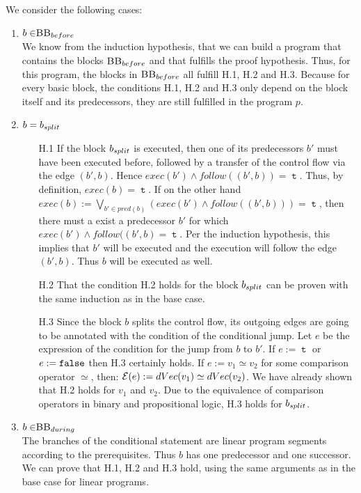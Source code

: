 We consider the following cases:
\begin{enumerate}
    \item $b \in \mbb_{before}$\\
    We know from the induction hypothesis, that we can build a program that contains the blocks $\mbb_{before}$ and that fulfills the proof hypothesis. Thus, for this program, the blocks in $\mbb_{before}$ all fulfill H.1, H.2 and H.3.
    Because for every basic block, the conditions H.1, H.2 and H.3 only depend on the block itself and its predecessors, they are still fulfilled in the program $p$.
    \item $b = b_{split}$
    \begin{itemize}
        \item[H.1] If the block $b_{split}$ is executed, then one of its predecessors $b'$ must have been executed before, followed by a transfer of the control flow via the edge $(b', b)$. Hence $exec(b') \land follow((b', b)) = \mttt$. Thus, by definition, $exec(b) = \mttt$. If on the other hand $exec(b):= \bigvee\limits_{b' \in pred(b)} (exec(b') \land follow((b', b))) = \mttt$, then there must a exist a predecessor $b'$ for which \\$exec(b') \land follow((b', b) = \mttt$. Per the induction hypothesis, this implies that $b'$ will be executed and the execution will follow the edge $(b', b)$. Thus $b$ will be executed as well.
        \item[H.2] That the condition H.2 holds for the block $b_{split}$ can be proven with the same induction as in the base case.
        \item [H.3] Since the block $b$ splits the control flow, its outgoing edges are going to be annotated with the condition of the conditional jump. Let $e$ be the expression of the condition for the jump from $b$ to $b'$. If $e := \mttt$ or $e := \mathtt{false}$ then H.3 certainly holds. If $e := v_1 \simeq v_2$ for some comparison operator $\simeq$, then:
        $\mathcal{E}(e) := dVec(v_1) \simeq dVec(v_2)$. We have already shown that H.2 holds for $v_1$ and $v_2$. Due to the equivalence of comparison operators in binary and propositional logic, H.3 holds for $b_{split}$.
    \end{itemize}
    
    \item $b \in \mbb_{during}$\\
    The branches of the conditional statement are linear program segments according to the prerequisites. Thus $b$ has one predecessor and one successor. We can prove that H.1, H.2 and H.3 hold, using the same arguments as in the base case for linear programs.
    

\end{enumerate}
